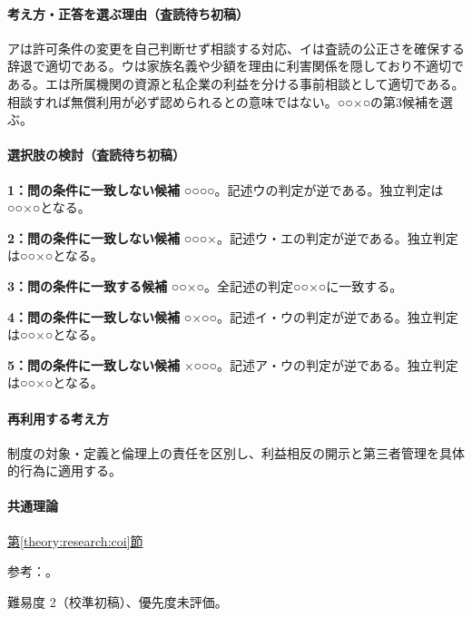 \paragraph{考え方・正答を選ぶ理由（査読待ち初稿）} アは許可条件の変更を自己判断せず相談する対応、イは査読の公正さを確保する辞退で適切である。ウは家族名義や少額を理由に利害関係を隠しており不適切である。エは所属機関の資源と私企業の利益を分ける事前相談として適切である。相談すれば無償利用が必ず認められるとの意味ではない。○○×○の第3候補を選ぶ。

\paragraph{選択肢の検討（査読待ち初稿）}\mbox{}\par

\noindent\textbf{1：問の条件に一致しない候補} ○○○○。記述ウの判定が逆である。独立判定は○○×○となる。\par

\noindent\textbf{2：問の条件に一致しない候補} ○○○×。記述ウ・エの判定が逆である。独立判定は○○×○となる。\par

\noindent\textbf{3：問の条件に一致する候補} ○○×○。全記述の判定○○×○に一致する。\par

\noindent\textbf{4：問の条件に一致しない候補} ○×○○。記述イ・ウの判定が逆である。独立判定は○○×○となる。\par

\noindent\textbf{5：問の条件に一致しない候補} ×○○○。記述ア・ウの判定が逆である。独立判定は○○×○となる。\par

\paragraph{再利用する考え方} 制度の対象・定義と倫理上の責任を区別し、利益相反の開示と第三者管理を具体的行為に適用する。

\paragraph{共通理論} \hyperref[theory:research:coi]{第\ref*{theory:research:coi}節}

\par 参考：\cite{jsps_integrity2025}。

\par 難易度 2（校準初稿）、優先度未評価。

